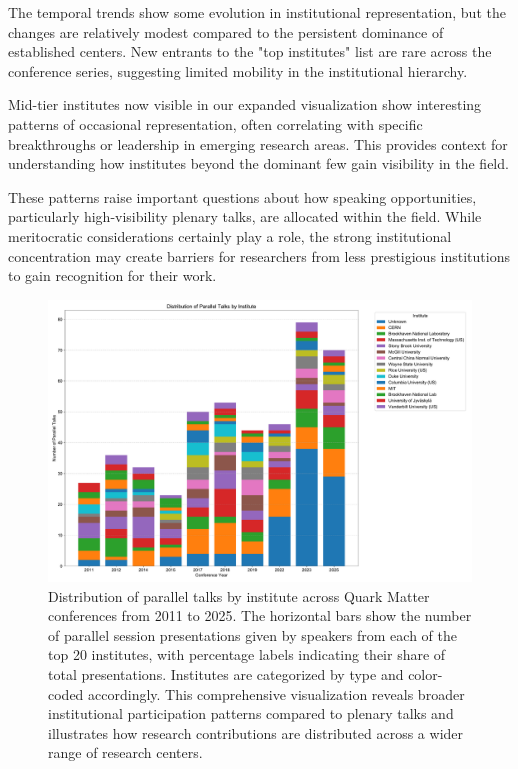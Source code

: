 \documentclass[a4paper,11pt]{article}
\begin{document}
The temporal trends show some evolution in institutional representation, but the changes are relatively modest compared to the persistent dominance of established centers. New entrants to the "top institutes" list are rare across the conference series, suggesting limited mobility in the institutional hierarchy.

Mid-tier institutes now visible in our expanded visualization show interesting patterns of occasional representation, often correlating with specific breakthroughs or leadership in emerging research areas. This provides context for understanding how institutes beyond the dominant few gain visibility in the field.

These patterns raise important questions about how speaking opportunities, particularly high-visibility plenary talks, are allocated within the field. While meritocratic considerations certainly play a role, the strong institutional concentration may create barriers for researchers from less prestigious institutions to gain recognition for their work.

\begin{figure}[H]
\centering
\includegraphics[width=\textwidth]{figures/parallel_talks_by_institute.pdf}
\caption{Distribution of parallel talks by institute across Quark Matter conferences from 2011 to 2025. The horizontal bars show the number of parallel session presentations given by speakers from each of the top 20 institutes, with percentage labels indicating their share of total presentations. Institutes are categorized by type and color-coded accordingly. This comprehensive visualization reveals broader institutional participation patterns compared to plenary talks and illustrates how research contributions are distributed across a wider range of research centers.}
\label{fig:institute_parallel}
\end{figure}
\end{document}

